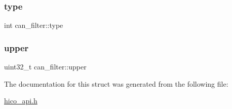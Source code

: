 \mbox{\label{structcan__filter_a796cdd0845b3b22c44028a898938d3e0}} 
\subsubsection{\texorpdfstring{type}{type}}
{\footnotesize\ttfamily int can\+\_\+filter\+::type}

\mbox{\label{structcan__filter_a75039f47394150965764154e50f2f3e1}} 
\subsubsection{\texorpdfstring{upper}{upper}}
{\footnotesize\ttfamily uint32\+\_\+t can\+\_\+filter\+::upper}



The documentation for this struct was generated from the following file\+:\begin{DoxyCompactItemize}
\item 
\hyperlink{hico__api_8h}{hico\+\_\+api.\+h}\end{DoxyCompactItemize}
